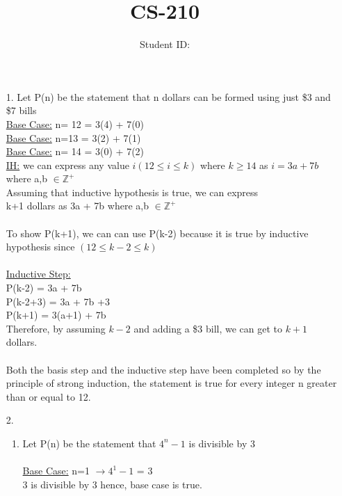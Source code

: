 \documentclass{article}
\title{CS-210 \hwNo}
\author{\myname \qquad Student ID: \myid}
\begin{document}
\maketitle
\begin{enumerate}[(1. ]
\Large

\item [1. ] 
Let P(n) be the statement that n dollars can be formed using just \$3 and \$7 bills \\
\underline{Base Case:} n= 12 = 3(4) + 7(0) \\
\underline{Base Case:} n=13 = 3(2) + 7(1) \\
\underline{Base Case:} n= 14 = 3(0) + 7(2) \\

\underline{IH:} we can express any value $i(12 \leq i \leq k)$ where $k \geq 14$ as $i=3a + 7b$ where a,b $ \in  \mathbb{Z}^+ $ \\

Assuming that inductive hypothesis is true, we can express \\
k+1 dollars as 3a + 7b  where a,b $ \in  \mathbb{Z}^+ $ \\ \\
To show P(k+1), we can can use P(k-2) because it is true by inductive hypothesis since $(12 \leq k-2 \leq k) $ \\ \\
\underline{Inductive Step:} \\
P(k-2) = 3a + 7b \\ 
P(k-2+3) = 3a + 7b +3 \\
P(k+1) = 3(a+1) + 7b \\
Therefore, by assuming $k-2$ and adding a \$3 bill, we can get to $k+1$  dollars. \\ \\
Both the basis step and the inductive step have been completed so by the principle of strong induction, the statement is true for every integer n greater than or equal to 12.
\pagebreak

\item [2. ] 
\begin{enumerate}
\item 
Let P(n) be the statement that $4^n -1$ is divisible by 3 \\ \\
\underline{Base Case:} n=1 $ \rightarrow 4^1 - 1$ = 3 \\
3 is divisible by 3 hence, base case is true. \\ 


\end{enumerate}
\end{enumerate}
\end{document}
